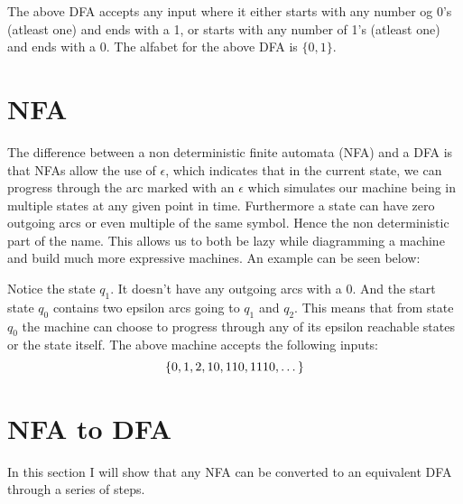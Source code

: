 The above DFA accepts any input where it either starts with any number og 0's (atleast one) and ends with a 1, or starts with any number of 1's (atleast one) and ends with a 0. The alfabet for the above DFA is $\{0, 1\}$.

\section{NFA}

The difference between a non deterministic finite automata (NFA) and a DFA is that NFAs allow the use of $\epsilon$, which indicates that in the current state, we can progress through the arc marked with an $\epsilon$ which simulates our machine being in multiple states at any given point in time. Furthermore a state can have zero outgoing arcs or even multiple of the same symbol. Hence the non deterministic part of the name. This allows us to both be lazy while diagramming a machine and build much more expressive machines. An example can be seen below:


\begin{center}
\end{center}

Notice the state $q_1$. It doesn't have any outgoing arcs with a $0$. And the start state $q_0$ contains two epsilon arcs going to $q_1$ and $q_2$. This means that from state $q_0$ the machine can choose to progress through any of its epsilon reachable states or the state itself. The above machine accepts the following inputs:
\[\left\{0, 1, 2, 10, 110, 1110, \dots\right\}\]

\section{NFA to DFA}

In this section I will show that any NFA can be converted to an equivalent DFA through a series of steps. 

